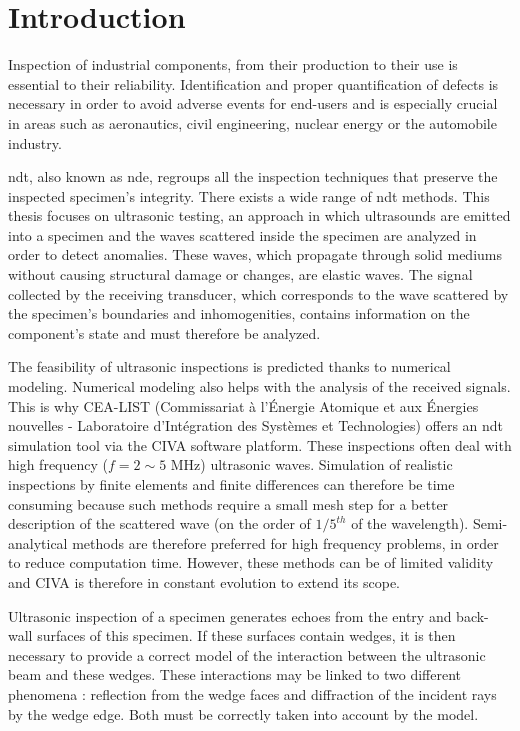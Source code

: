 \chapter*{Introduction}

Inspection of industrial components, from their production to their use is essential to their reliability. Identification and proper quantification of defects is necessary in order to avoid adverse events for end-users and is especially crucial in areas such as aeronautics, civil engineering, nuclear energy or the automobile industry. 

\acrfull{ndt}, also known as \acrfull{nde}, regroups all the inspection techniques that preserve the inspected specimen's integrity. There exists a wide range of \acrshort{ndt} methods. This thesis focuses on ultrasonic testing, an approach in which ultrasounds are emitted into a specimen and the waves scattered inside the specimen are analyzed in order to detect anomalies. These waves, which propagate through solid mediums without causing structural damage or changes, are elastic waves. The signal collected by the receiving transducer, which corresponds to the wave scattered by the specimen's boundaries and inhomogenities, contains information on the component's state and must therefore be analyzed.

The feasibility of ultrasonic inspections is predicted thanks to numerical modeling. Numerical modeling also helps with the analysis of the received signals. This is why CEA-LIST (Commissariat à l’Énergie Atomique et aux Énergies nouvelles - Laboratoire d’Intégration des Systèmes et Technologies) offers an \acrshort{ndt} simulation tool via the CIVA software platform. These inspections often deal with high frequency ($f = 2\sim5$ MHz)
ultrasonic waves. Simulation of realistic inspections by finite elements and finite differences can therefore be time consuming because such methods require a small mesh step for a better description of the scattered wave (on the order of $1/5^{th}$ of the wavelength). Semi-analytical methods are therefore preferred for high frequency problems, in order to reduce computation time. However, these methods can be of limited validity and CIVA is therefore in constant evolution to extend its scope.

Ultrasonic inspection of a specimen generates echoes from the entry and back-wall surfaces of this specimen. If these surfaces contain wedges, it is then necessary to provide a correct model of the interaction between the ultrasonic beam and these wedges. These interactions may be linked to two different phenomena : reflection from the wedge faces and diffraction of the incident rays by the wedge edge. Both must be correctly taken into account by the model.

